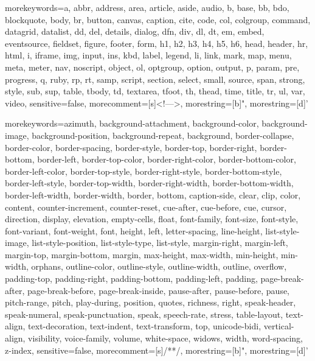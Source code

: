  {morekeywords={a, abbr, address, area, article, aside, audio, b, base, bb, bdo, blockquote,  body, br, button, canvas, caption, cite, code, col, colgroup, command, datagrid, datalist, dd, del, details, dialog, dfn, div, dl, dt, em, embed, eventsource, fieldset, figure, footer,  form,  h1, h2,  h3,  h4, h5,  h6,  head,  header,  hr, html,  i, iframe,  img,  input,  ins, kbd,  label,  legend,  li,  link,  mark,  map,  menu,  meta,  meter,  nav,  noscript,  object,  ol,  optgroup,  option,  output,  p,  param,  pre,  progress,  q,  ruby,  rp,  rt,  samp,  script,  section,  select,  small,  source,  span,  strong,  style,  sub,  sup,  table,  tbody,  td,  textarea,  tfoot,  th,  thead,  time,  title,  tr,  ul,  var,  video},
sensitive=false, morecomment=[s]{<!--}{-->}, morestring=[b]", morestring=[d]'}

 {morekeywords={azimuth,  background-attachment,  background-color,  background-image,  background-position,  background-repeat,  background,  border-collapse,  border-color,  border-spacing,  border-style,  border-top, border-right, border-bottom, border-left,  border-top-color, border-right-color, border-bottom-color, border-left-color,  border-top-style, border-right-style, border-bottom-style, border-left-style,  border-top-width, border-right-width, border-bottom-width, border-left-width,  border-width,  border,  bottom,  caption-side,  clear,  clip,  color,  content,  counter-increment,  counter-reset,  cue-after,  cue-before,  cue,  cursor,  direction,  display,  elevation,  empty-cells,  float,  font-family,  font-size,  font-style,  font-variant,  font-weight,  font,  height,  left,  letter-spacing,  line-height,  list-style-image,  list-style-position,  list-style-type,  list-style,  margin-right, margin-left,  margin-top, margin-bottom,  margin,  max-height,  max-width,  min-height,  min-width,  orphans,  outline-color,  outline-style,  outline-width,  outline,  overflow,  padding-top, padding-right, padding-bottom, padding-left,  padding,  page-break-after,  page-break-before,  page-break-inside,  pause-after,  pause-before,  pause,  pitch-range,  pitch,  play-during,  position,  quotes,  richness,  right,  speak-header,  speak-numeral,  speak-punctuation,  speak,  speech-rate,  stress,  table-layout,  text-align,  text-decoration,  text-indent,  text-transform,  top,  unicode-bidi,  vertical-align,  visibility,  voice-family,  volume,  white-space,  widows,  width,  word-spacing,  z-index},
sensitive=false, morecomment=[s]{/*}{*/}, morestring=[b]", morestring=[d]'}

